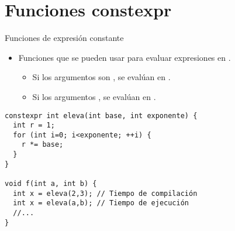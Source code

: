 \section{Funciones \textbf{constexpr}}

\begin{frame}[t,fragile]{Funciones de expresión constante}
\begin{itemize}
  \item Funciones que se pueden usar para evaluar
        expresiones en .
    \begin{itemize}
      \item Si los argumentos son ,
            se evalúan en .
      \item Si los argumentos  ,
            se evalúan en .
    \end{itemize}
\end{itemize}

\begin{lstlisting}
constexpr int eleva(int base, int exponente) {
  int r = 1;
  for (int i=0; i<exponente; ++i) {
    r *= base;
  }
}

void f(int a, int b) {
  int x = eleva(2,3); // Tiempo de compilación
  int x = eleva(a,b); // Tiempo de ejecución
  //...
}
\end{lstlisting}
\end{frame}
